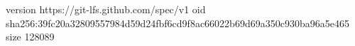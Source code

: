 version https://git-lfs.github.com/spec/v1
oid sha256:39fc20a32809557984d59d24fbf6cd9f8ac66022b69d69a350c930ba96a5e465
size 128089
